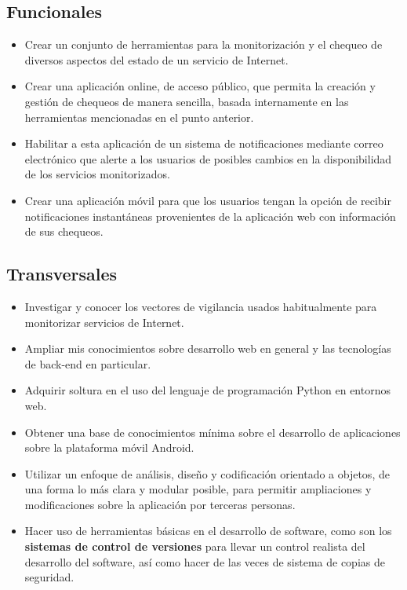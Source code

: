 \subsection{Funcionales}
\begin{itemize}
\item Crear un conjunto de herramientas para la monitorización y el chequeo de
  diversos aspectos del estado de un servicio de Internet.
\item Crear una aplicación online, de acceso público, que permita la creación y
  gestión de chequeos de manera sencilla, basada internamente en las
  herramientas mencionadas en el punto anterior.
\item Habilitar a esta aplicación de un sistema de notificaciones mediante correo
  electrónico que alerte a los usuarios de posibles cambios en la disponibilidad
  de los servicios monitorizados.
\item Crear una aplicación móvil para que los usuarios tengan la opción de
  recibir notificaciones instantáneas provenientes de la aplicación web con
  información de sus chequeos.
\end{itemize}

\subsection{Transversales}
\begin{itemize}
\item Investigar y conocer los vectores de vigilancia usados habitualmente para
  monitorizar servicios de Internet.
\item Ampliar mis conocimientos sobre desarrollo web en general y las
  tecnologías de back-end en particular.
\item Adquirir soltura en el uso del lenguaje de programación Python en entornos
  web.
\item Obtener una base de conocimientos mínima sobre el desarrollo de
  aplicaciones sobre la plataforma móvil Android.
\item Utilizar un enfoque de análisis, diseño y codificación orientado
  a objetos, de una forma lo más clara y modular posible, para
  permitir ampliaciones y modificaciones sobre la aplicación por
  terceras personas.
\item Hacer uso de herramientas básicas en el desarrollo de software,
  como son los \textbf{sistemas de control de versiones} para llevar
  un control realista del desarrollo del software, así como hacer de
  las veces de sistema de copias de seguridad.
\end{itemize}

